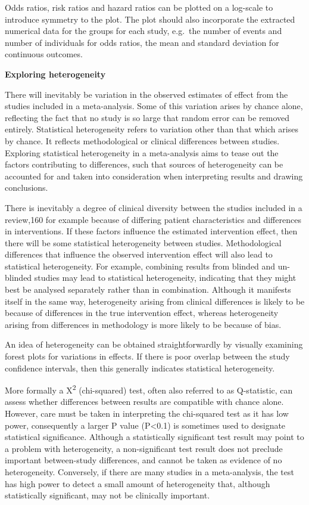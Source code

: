 \documentclass[
  10pt,
  a4paper,
  DIV=11,
  numbers=noendperiod]{scrreprt}
\begin{document}
Odds ratios, risk ratios and hazard ratios can be plotted on a log-scale
to introduce symmetry to the plot. The plot should also incorporate the
extracted numerical data for the groups for each study, e.g.~the number
of events and number of individuals for odds ratios, the mean and
standard deviation for continuous outcomes.

\textbf{Exploring heterogeneity}

There will inevitably be variation in the observed estimates of effect
from the studies included in a meta-analysis. Some of this variation
arises by chance alone, reflecting the fact that no study is so large
that random error can be removed entirely. Statistical heterogeneity
refers to variation other than that which arises by chance. It reflects
methodological or clinical differences between studies. Exploring
statistical heterogeneity in a meta-analysis aims to tease out the
factors contributing to differences, such that sources of heterogeneity
can be accounted for and taken into consideration when interpreting
results and drawing conclusions.

There is inevitably a degree of clinical diversity between the studies
included in a review,160 for example because of differing patient
characteristics and differences in interventions. If these factors
influence the estimated intervention effect, then there will be some
statistical heterogeneity between studies. Methodological differences
that influence the observed intervention effect will also lead to
statistical heterogeneity. For example, combining results from blinded
and un-blinded studies may lead to statistical heterogeneity, indicating
that they might best be analysed separately rather than in combination.
Although it manifests itself in the same way, heterogeneity arising from
clinical differences is likely to be because of differences in the true
intervention effect, whereas heterogeneity arising from differences in
methodology is more likely to be because of bias.

An idea of heterogeneity can be obtained straightforwardly by visually
examining forest plots for variations in effects. If there is poor
overlap between the study confidence intervals, then this generally
indicates statistical heterogeneity.

More formally a X\textsuperscript{2} (chi-squared) test, often also
referred to as Q-statistic, can assess whether differences between
results are compatible with chance alone. However, care must be taken in
interpreting the chi-squared test as it has low power, consequently a
larger P value (P\textless0.1) is sometimes used to designate
statistical significance. Although a statistically significant test
result may point to a problem with heterogeneity, a non-significant test
result does not preclude important between-study differences, and cannot
be taken as evidence of no heterogeneity. Conversely, if there are many
studies in a meta-analysis, the test has high power to detect a small
amount of heterogeneity that, although statistically significant, may
not be clinically important.
\end{document}
